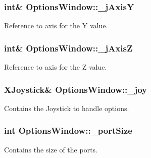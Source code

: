 \subsubsection[{\+\_\+j\+Axis\+Y}]{\setlength{\rightskip}{0pt plus 5cm}int\& Options\+Window\+::\+\_\+j\+Axis\+Y\hspace{0.3cm}{\ttfamily [private]}}\label{a00005_a8921d1cc5bcb527466c28feb5dcc59b1}


Reference to axis for the Y value. 

\hypertarget{a00005_a47409f50a87942706baaea3d025785e3}{}
\subsubsection[{\+\_\+j\+Axis\+Z}]{\setlength{\rightskip}{0pt plus 5cm}int\& Options\+Window\+::\+\_\+j\+Axis\+Z\hspace{0.3cm}{\ttfamily [private]}}\label{a00005_a47409f50a87942706baaea3d025785e3}


Reference to axis for the Z value. 

\hypertarget{a00005_a1bf846ab681ab245f70adac30999947c}{}
\subsubsection[{\+\_\+joy}]{\setlength{\rightskip}{0pt plus 5cm}X\+Joystick\& Options\+Window\+::\+\_\+joy\hspace{0.3cm}{\ttfamily [private]}}\label{a00005_a1bf846ab681ab245f70adac30999947c}


Contains the Joystick to handle options. 

\hypertarget{a00005_a9bd4dccc7a544b1db78dc8cf330b88f6}{}
\subsubsection[{\+\_\+port\+Size}]{\setlength{\rightskip}{0pt plus 5cm}int Options\+Window\+::\+\_\+port\+Size\hspace{0.3cm}{\ttfamily [private]}}\label{a00005_a9bd4dccc7a544b1db78dc8cf330b88f6}


Contains the size of the ports. 

